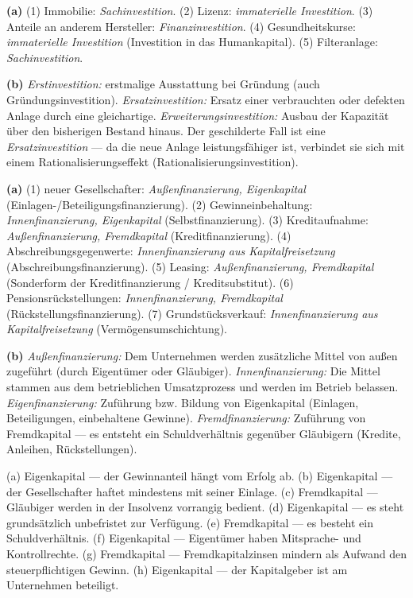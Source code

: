 \documentclass[11pt, a4paper]{article}
\begin{document}
\begin{loesung}[title={Lösung Aufgabe~3 --- Investitionsarten}]
\textbf{(a)} (1) Immobilie: \emph{Sachinvestition}. (2) Lizenz: \emph{immaterielle
Investition}. (3) Anteile an anderem Hersteller: \emph{Finanzinvestition}.
(4) Gesundheitskurse: \emph{immaterielle Investition} (Investition in das Humankapital).
(5) Filteranlage: \emph{Sachinvestition}.

\textbf{(b)} \emph{Erstinvestition:} erstmalige Ausstattung bei Gründung (auch
Gründungsinvestition). \emph{Ersatzinvestition:} Ersatz einer verbrauchten oder defekten
Anlage durch eine gleichartige. \emph{Erweiterungsinvestition:} Ausbau der Kapazität über
den bisherigen Bestand hinaus. Der geschilderte Fall ist eine \emph{Ersatzinvestition} ---
da die neue Anlage leistungsfähiger ist, verbindet sie sich mit einem
Rationalisierungseffekt (Rationalisierungsinvestition).
\end{loesung}

\begin{loesung}[title={Lösung Aufgabe~4 --- Finanzierungsarten}]
\textbf{(a)}
(1) neuer Gesellschafter: \emph{Außenfinanzierung, Eigenkapital}
(Einlagen-/Beteiligungsfinanzierung).
(2) Gewinneinbehaltung: \emph{Innenfinanzierung, Eigenkapital} (Selbstfinanzierung).
(3) Kreditaufnahme: \emph{Außenfinanzierung, Fremdkapital} (Kreditfinanzierung).
(4) Abschreibungsgegenwerte: \emph{Innenfinanzierung aus Kapitalfreisetzung}
(Abschreibungsfinanzierung).
(5) Leasing: \emph{Außenfinanzierung, Fremdkapital} (Sonderform der Kreditfinanzierung /
Kreditsubstitut).
(6) Pensionsrückstellungen: \emph{Innenfinanzierung, Fremdkapital}
(Rückstellungsfinanzierung).
(7) Grundstücksverkauf: \emph{Innenfinanzierung aus Kapitalfreisetzung}
(Vermögensumschichtung).

\textbf{(b)} \emph{Außenfinanzierung:} Dem Unternehmen werden zusätzliche Mittel von
außen zugeführt (durch Eigentümer oder Gläubiger). \emph{Innenfinanzierung:} Die Mittel
stammen aus dem betrieblichen Umsatzprozess und werden im Betrieb belassen.
\emph{Eigenfinanzierung:} Zuführung bzw. Bildung von Eigenkapital (Einlagen, Beteiligungen,
einbehaltene Gewinne). \emph{Fremdfinanzierung:} Zuführung von Fremdkapital --- es
entsteht ein Schuldverhältnis gegenüber Gläubigern (Kredite, Anleihen, Rückstellungen).
\end{loesung}

\begin{loesung}[title={Lösung Aufgabe~5 --- Eigenkapital vs. Fremdkapital}]
(a) Eigenkapital --- der Gewinnanteil hängt vom Erfolg ab.
(b) Eigenkapital --- der Gesellschafter haftet mindestens mit seiner Einlage.
(c) Fremdkapital --- Gläubiger werden in der Insolvenz vorrangig bedient.
(d) Eigenkapital --- es steht grundsätzlich unbefristet zur Verfügung.
(e) Fremdkapital --- es besteht ein Schuldverhältnis.
(f) Eigenkapital --- Eigentümer haben Mitsprache- und Kontrollrechte.
(g) Fremdkapital --- Fremdkapitalzinsen mindern als Aufwand den steuerpflichtigen Gewinn.
(h) Eigenkapital --- der Kapitalgeber ist am Unternehmen beteiligt.
\end{loesung}
\end{document}
